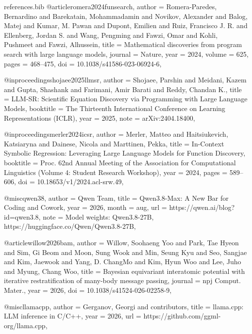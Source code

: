 \begin{filecontents*}[overwrite]{references.bib}
@article{romera2024funsearch,
  author = {Romera-Paredes, Bernardino and Barekatain, Mohammadamin and Novikov, Alexander and Balog, Matej and Kumar, M. Pawan and Dupont, Emilien and Ruiz, Francisco J. R. and Ellenberg, Jordan S. and Wang, Pengming and Fawzi, Omar and Kohli, Pushmeet and Fawzi, Alhussein},
  title = {Mathematical discoveries from program search with large language models},
  journal = {Nature},
  year = {2024},
  volume = {625},
  pages = {468--475},
  doi = {10.1038/s41586-023-06924-6},
}

@inproceedings{shojaee2025llmsr,
  author = {Shojaee, Parshin and Meidani, Kazem and Gupta, Shashank and Farimani, Amir Barati and Reddy, Chandan K.},
  title = {{LLM-SR}: Scientific Equation Discovery via Programming with Large Language Models},
  booktitle = {The Thirteenth International Conference on Learning Representations (ICLR)},
  year = {2025},
  note = {arXiv:2404.18400},
}

@inproceedings{merler2024icsr,
  author = {Merler, Matteo and Haitsiukevich, Katsiaryna and Dainese, Nicola and Marttinen, Pekka},
  title = {In-Context Symbolic Regression: Leveraging Large Language Models for Function Discovery},
  booktitle = {Proc. 62nd Annual Meeting of the Association for Computational Linguistics (Volume 4: Student Research Workshop)},
  year = {2024},
  pages = {589--606},
  doi = {10.18653/v1/2024.acl-srw.49},
}

@misc{qwen38,
  author = {{Qwen Team}},
  title = {{Qwen3.8-Max}: A New Bar for Coding and Cowork},
  year = {2026},
  month = aug,
  url = {https://qwen.ai/blog?id=qwen3.8},
  note = {Model weights: Qwen3.8-27B, https://huggingface.co/Qwen/Qwen3.8-27B},
}

@article{willow2026bam,
  author = {Willow, Soohaeng Yoo and Park, Tae Hyeon and Sim, Gi Beom and Moon, Sung Wook and Min, Seung Kyu and Seo, Sangjae and Kim, Jaewook and Yang, D. ChangMo and Kim, Hyun Woo and Lee, Juho and Myung, Chang Woo},
  title = {Bayesian equivariant interatomic potential with iterative restratification of many-body message passing},
  journal = {npj Comput. Mater.},
  year = {2026},
  doi = {10.1038/s41524-026-02258-9},
}

@misc{llamacpp,
  author = {Gerganov, Georgi and {contributors}},
  title = {llama.cpp: {LLM} inference in {C/C++}},
  year = {2026},
  url = {https://github.com/ggml-org/llama.cpp},
}


\end{filecontents*}
